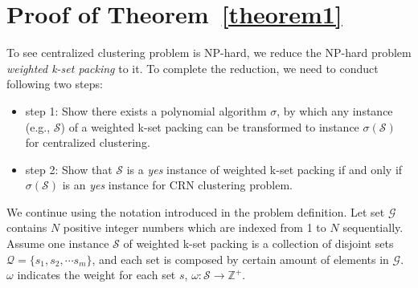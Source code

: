 \documentclass[journal,comsoc]{IEEEtran}
\makeatletter
\theoremstyle{mytheoremstyle}
\theoremstyle{mytheoremstyle}
\theoremstyle{mytheoremstyle}
\renewenvironment{proof}[1][\proofname]{%
      \par\pushQED{\qed}\fontfamily{ptm}\selectfont%
      \topsep6\p@\@plus6\p@\relax
      \trivlist\item[\hskip\labelsep\bfseries#1\@addpunct{.}]%
      \ignorespaces
    }{%
      \popQED\endtrivlist\@endpefalse
    }
\newcommand{\eg}{e.g., }
\makeatother
\begin{document}
\section*{Proof of Theorem~\ref{theorem1}}
\label{proof_theorem1}
\begin{proof}
To see centralized clustering problem is NP-hard, we reduce the NP-hard problem \textit{weighted k-set packing} to it.
To complete the reduction, we need to conduct following two steps:
\begin{itemize}
\item step 1: Show there exists a polynomial algorithm $\sigma$, by which any instance (\eg $\mathcal{S}$) of a weighted k-set packing can be transformed to instance $\sigma(\mathcal{S})$ for centralized clustering.
\item step 2: Show that $\mathcal{S}$ is a \textit{yes} instance of weighted k-set packing if and only if $\sigma(\mathcal{S})$ is an \textit{yes} instance for CRN clustering problem.
\end{itemize}

We continue using the notation introduced in the problem definition.
Let set $\mathcal{G}$ contains $N$ positive integer numbers which are indexed from 1 to $N$ sequentially.
Assume one instance $\mathcal{S}$ of weighted k-set packing is a collection of disjoint sets $\mathcal{Q} = \{s_1, s_2,\cdots s_m\}$, and each set is composed by certain amount of elements in $\mathcal{G}$.
$\omega$ indicates the weight for each set $s$, $\omega:\mathcal{S}\rightarrow \mathbb{Z}^{+}$.




\end{proof}
\end{document}
